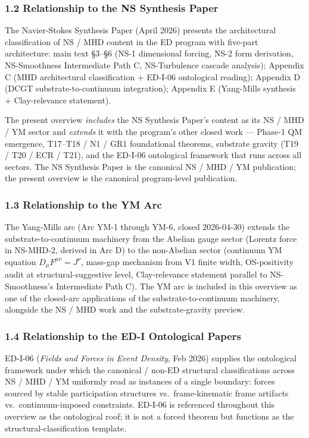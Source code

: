 \documentclass[
  11pt,a4paper]{article}
\begin{document}
\subsubsection{1.2 Relationship to the NS Synthesis
Paper}\label{relationship-to-the-ns-synthesis-paper}

The Navier-Stokes Synthesis Paper (April 2026) presents the
architectural classification of NS / MHD content in the ED program with
five-part architecture: main text §3--§6 (NS-1 dimensional forcing, NS-2
form derivation, NS-Smoothness Intermediate Path C, NS-Turbulence
cascade analysis); Appendix C (MHD architectural classification +
ED-I-06 ontological reading); Appendix D (DCGT substrate-to-continuum
integration); Appendix E (Yang-Mills synthesis + Clay-relevance
statement).

The present overview \emph{includes} the NS Synthesis Paper's content as
its NS / MHD / YM sector and \emph{extends} it with the program's other
closed work --- Phase-1 QM emergence, T17--T18 / N1 / GR1 foundational
theorems, substrate gravity (T19 / T20 / ECR / T21), and the ED-I-06
ontological framework that runs across all sectors. The NS Synthesis
Paper is the canonical NS / MHD / YM publication; the present overview
is the canonical program-level publication.

\subsubsection{1.3 Relationship to the YM
Arc}\label{relationship-to-the-ym-arc}

The Yang-Mills arc (Arc YM-1 through YM-6, closed 2026-04-30) extends
the substrate-to-continuum machinery from the Abelian gauge sector
(Lorentz force in NS-MHD-2, derived in Arc D) to the non-Abelian sector
(continuum YM equation \(D_\mu F^{\mu\nu} = J^\nu\), mass-gap mechanism
from V1 finite width, OS-positivity audit at structural-suggestive
level, Clay-relevance statement parallel to NS-Smoothness's Intermediate
Path C). The YM arc is included in this overview as one of the
closed-arc applications of the substrate-to-continuum machinery,
alongside the NS / MHD work and the substrate-gravity preview.

\subsubsection{1.4 Relationship to the ED-I Ontological
Papers}\label{relationship-to-the-ed-i-ontological-papers}

ED-I-06 (\emph{Fields and Forces in Event Density}, Feb 2026) supplies
the ontological framework under which the canonical / non-ED structural
classifications across NS / MHD / YM uniformly read as instances of a
single boundary: forces sourced by stable participation structures
vs.~frame-kinematic frame artifacts vs.~continuum-imposed constraints.
ED-I-06 is referenced throughout this overview as the ontological roof;
it is not a forced theorem but functions as the
structural-classification template.
\end{document}
